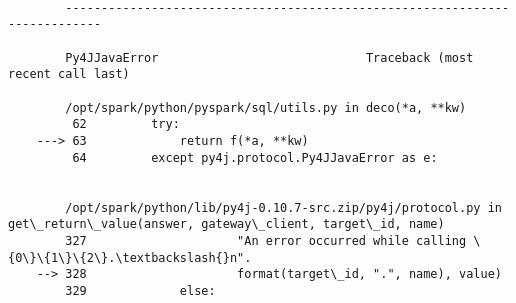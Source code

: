 \documentclass[11pt]{article}
\begin{document}
    \begin{Verbatim}[commandchars=\\\{\}]

        ---------------------------------------------------------------------------

        Py4JJavaError                             Traceback (most recent call last)

        /opt/spark/python/pyspark/sql/utils.py in deco(*a, **kw)
         62         try:
    ---> 63             return f(*a, **kw)
         64         except py4j.protocol.Py4JJavaError as e:


        /opt/spark/python/lib/py4j-0.10.7-src.zip/py4j/protocol.py in get\_return\_value(answer, gateway\_client, target\_id, name)
        327                     "An error occurred while calling \{0\}\{1\}\{2\}.\textbackslash{}n".
    --> 328                     format(target\_id, ".", name), value)
        329             else:



\end{Verbatim}
\end{document}
